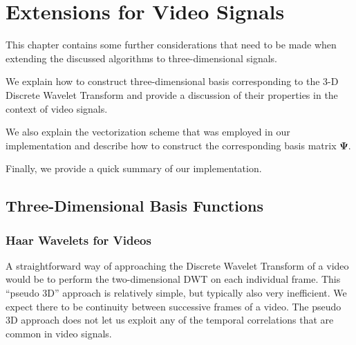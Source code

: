 \chapter{Extensions for Video Signals}
\label{ch:video}
This chapter contains some further considerations that need to be made when extending the discussed algorithms to three-dimensional signals.

We explain how to construct three-dimensional basis corresponding to the 3-D Discrete Wavelet Transform and provide a discussion of their properties in the context of video signals.

We also explain the vectorization scheme that was employed in our implementation and describe how to construct the corresponding basis matrix $\bm\Psi$.

Finally, we provide a quick summary of our implementation.

\section{Three-Dimensional Basis Functions}
\subsection{Haar Wavelets for Videos}
A straightforward way of approaching the Discrete Wavelet Transform of a video would be to perform the two-dimensional DWT on each individual frame. 
This ``pseudo 3D'' approach is relatively simple, but typically also very inefficient.
We expect there to be continuity between successive frames of a video.
The pseudo 3D approach does not let us exploit any of the temporal correlations that are common in video signals.


